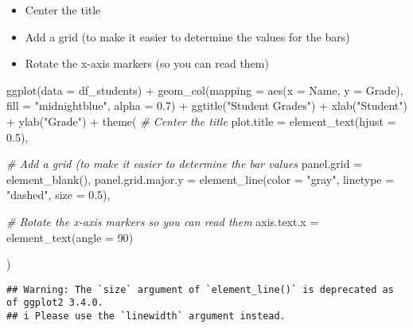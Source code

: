 \documentclass[
]{article}
\newenvironment{Shaded}{\begin{snugshade}}{\end{snugshade}}
\newcommand{\AttributeTok}[1]{\textcolor[rgb]{0.77,0.63,0.00}{#1}}
\newcommand{\CommentTok}[1]{\textcolor[rgb]{0.56,0.35,0.01}{\textit{#1}}}
\newcommand{\DecValTok}[1]{\textcolor[rgb]{0.00,0.00,0.81}{#1}}
\newcommand{\FloatTok}[1]{\textcolor[rgb]{0.00,0.00,0.81}{#1}}
\newcommand{\FunctionTok}[1]{\textcolor[rgb]{0.00,0.00,0.00}{#1}}
\newcommand{\NormalTok}[1]{#1}
\newcommand{\SpecialCharTok}[1]{\textcolor[rgb]{0.00,0.00,0.00}{#1}}
\newcommand{\StringTok}[1]{\textcolor[rgb]{0.31,0.60,0.02}{#1}}
\providecommand{\tightlist}{%
  \setlength{\itemsep}{0pt}\setlength{\parskip}{0pt}}
\begin{document}
\begin{itemize}
\tightlist
\item
  Center the title
\item
  Add a grid (to make it easier to determine the values for the bars)
\item
  Rotate the x-axis markers (so you can read them)
\end{itemize}

\begin{Shaded}
\begin{Highlighting}[]
\FunctionTok{ggplot}\NormalTok{(}\AttributeTok{data =}\NormalTok{ df\_students) }\SpecialCharTok{+}
  \FunctionTok{geom\_col}\NormalTok{(}\AttributeTok{mapping =} \FunctionTok{aes}\NormalTok{(}\AttributeTok{x =}\NormalTok{ Name, }\AttributeTok{y =}\NormalTok{ Grade),}
           \AttributeTok{fill =} \StringTok{"midnightblue"}\NormalTok{, }\AttributeTok{alpha =} \FloatTok{0.7}\NormalTok{) }\SpecialCharTok{+}
  \FunctionTok{ggtitle}\NormalTok{(}\StringTok{"Student Grades"}\NormalTok{) }\SpecialCharTok{+}
  \FunctionTok{xlab}\NormalTok{(}\StringTok{"Student"}\NormalTok{) }\SpecialCharTok{+}
  \FunctionTok{ylab}\NormalTok{(}\StringTok{"Grade"}\NormalTok{) }\SpecialCharTok{+}
  \FunctionTok{theme}\NormalTok{(}
    \CommentTok{\# Center the title}
    \AttributeTok{plot.title =} \FunctionTok{element\_text}\NormalTok{(}\AttributeTok{hjust =} \FloatTok{0.5}\NormalTok{),}
    
    \CommentTok{\# Add a grid (to make it easier to determine the bar values}
    \AttributeTok{panel.grid =} \FunctionTok{element\_blank}\NormalTok{(),}
    \AttributeTok{panel.grid.major.y =} \FunctionTok{element\_line}\NormalTok{(}\AttributeTok{color =} \StringTok{"gray"}\NormalTok{, }\AttributeTok{linetype =} \StringTok{"dashed"}\NormalTok{, }\AttributeTok{size =} \FloatTok{0.5}\NormalTok{),}
    
    \CommentTok{\# Rotate the x{-}axis markers so you can read them}
    \AttributeTok{axis.text.x =} \FunctionTok{element\_text}\NormalTok{(}\AttributeTok{angle =} \DecValTok{90}\NormalTok{)}
    
\NormalTok{  )}
\end{Highlighting}
\end{Shaded}

\begin{verbatim}
## Warning: The `size` argument of `element_line()` is deprecated as of ggplot2 3.4.0.
## i Please use the `linewidth` argument instead.
\end{verbatim}
\end{document}
